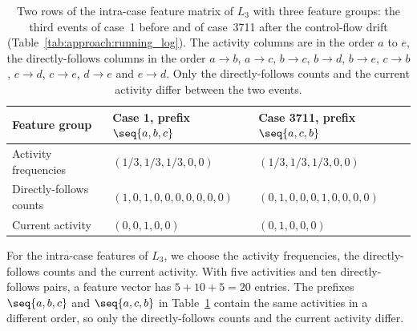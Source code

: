 \begin{table}[tb]
	\centering
	\caption[Intra-case feature vectors of the running example]{%
		Two rows of the intra-case feature matrix of $L_3$ with three feature groups: the third events of case~1 before and of case~3711 after the control-flow drift (Table~\ref{tab:approach:running_log}). The activity columns are in the order $a$ to $e$, the directly-follows columns in the order $a \to b$, $a \to c$, $b \to c$, $b \to d$, $b \to e$, $c \to b$, $c \to d$, $c \to e$, $d \to e$ and $e \to d$. Only the directly-follows counts and the current activity differ between the two events.}
	\label{tab:approach:features_intra}
	\small
	\begin{tabular}{@{}lll@{}}
		\toprule
		Feature group           & Case 1, prefix $\seq{a, b, c}$            & Case 3711, prefix $\seq{a, c, b}$         \\
		\midrule
		Activity frequencies    & $(1/3, 1/3, 1/3, 0, 0)$                   & $(1/3, 1/3, 1/3, 0, 0)$                   \\
		Directly-follows counts & $(1, 0, 1, 0, 0, 0, 0, 0, 0, 0)$ & $(0, 1, 0, 0, 0, 1, 0, 0, 0, 0)$ \\
		Current activity        & $(0, 0, 1, 0, 0)$                & $(0, 1, 0, 0, 0)$                \\
		\bottomrule
	\end{tabular}
\end{table}

\begin{example}
	\label{ex:approach:intra}
	For the intra-case features of $L_3$, we choose the activity frequencies, the directly-follows counts and the current activity. With five activities and ten directly-follows pairs, a feature vector has $5 + 10 + 5 = 20$ entries. The prefixes $\seq{a, b, c}$ and $\seq{a, c, b}$ in Table~\ref{tab:approach:features_intra} contain the same activities in a different order, so only the directly-follows counts and the current activity differ.
\end{example}


